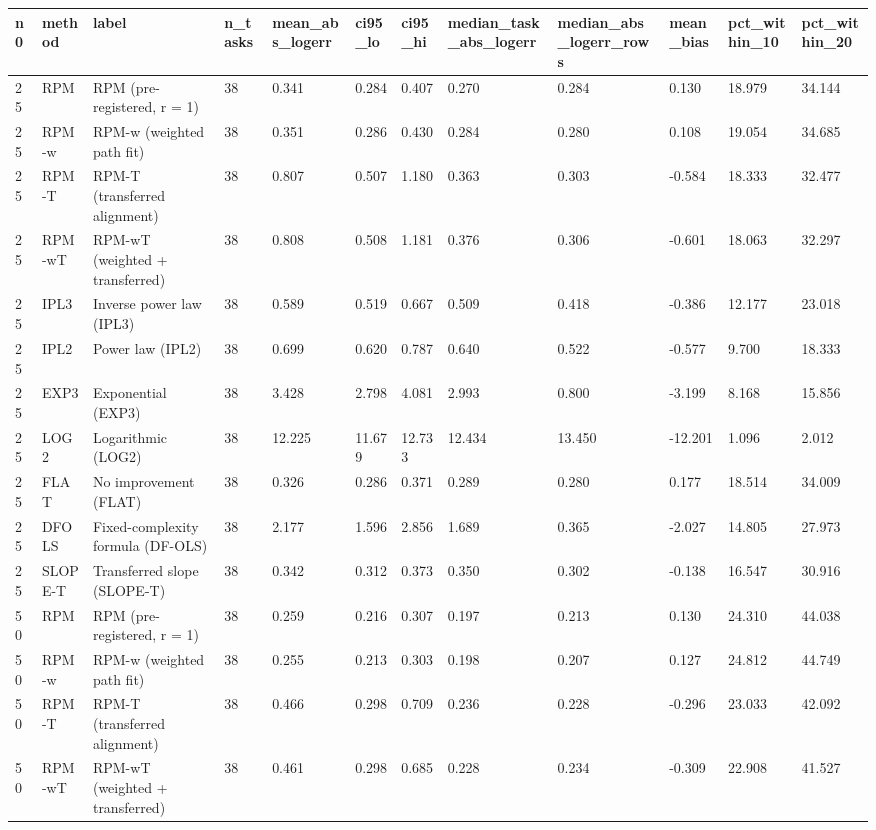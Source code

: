 \begin{tabular}{llllllllllll}
\hline
n0 & method & label & n\_tasks & mean\_abs\_logerr & ci95\_lo & ci95\_hi & median\_task\_abs\_logerr & median\_abs\_logerr\_rows & mean\_bias & pct\_within\_10 & pct\_within\_20 \\
\hline
25 & RPM & RPM (pre-registered, r = 1) & 38 & 0.341 & 0.284 & 0.407 & 0.270 & 0.284 & 0.130 & 18.979 & 34.144 \\
25 & RPM-w & RPM-w (weighted path fit) & 38 & 0.351 & 0.286 & 0.430 & 0.284 & 0.280 & 0.108 & 19.054 & 34.685 \\
25 & RPM-T & RPM-T (transferred alignment) & 38 & 0.807 & 0.507 & 1.180 & 0.363 & 0.303 & -0.584 & 18.333 & 32.477 \\
25 & RPM-wT & RPM-wT (weighted + transferred) & 38 & 0.808 & 0.508 & 1.181 & 0.376 & 0.306 & -0.601 & 18.063 & 32.297 \\
25 & IPL3 & Inverse power law (IPL3) & 38 & 0.589 & 0.519 & 0.667 & 0.509 & 0.418 & -0.386 & 12.177 & 23.018 \\
25 & IPL2 & Power law (IPL2) & 38 & 0.699 & 0.620 & 0.787 & 0.640 & 0.522 & -0.577 & 9.700 & 18.333 \\
25 & EXP3 & Exponential (EXP3) & 38 & 3.428 & 2.798 & 4.081 & 2.993 & 0.800 & -3.199 & 8.168 & 15.856 \\
25 & LOG2 & Logarithmic (LOG2) & 38 & 12.225 & 11.679 & 12.733 & 12.434 & 13.450 & -12.201 & 1.096 & 2.012 \\
25 & FLAT & No improvement (FLAT) & 38 & 0.326 & 0.286 & 0.371 & 0.289 & 0.280 & 0.177 & 18.514 & 34.009 \\
25 & DFOLS & Fixed-complexity formula (DF-OLS) & 38 & 2.177 & 1.596 & 2.856 & 1.689 & 0.365 & -2.027 & 14.805 & 27.973 \\
25 & SLOPE-T & Transferred slope (SLOPE-T) & 38 & 0.342 & 0.312 & 0.373 & 0.350 & 0.302 & -0.138 & 16.547 & 30.916 \\
50 & RPM & RPM (pre-registered, r = 1) & 38 & 0.259 & 0.216 & 0.307 & 0.197 & 0.213 & 0.130 & 24.310 & 44.038 \\
50 & RPM-w & RPM-w (weighted path fit) & 38 & 0.255 & 0.213 & 0.303 & 0.198 & 0.207 & 0.127 & 24.812 & 44.749 \\
50 & RPM-T & RPM-T (transferred alignment) & 38 & 0.466 & 0.298 & 0.709 & 0.236 & 0.228 & -0.296 & 23.033 & 42.092 \\
50 & RPM-wT & RPM-wT (weighted + transferred) & 38 & 0.461 & 0.298 & 0.685 & 0.228 & 0.234 & -0.309 & 22.908 & 41.527 \\

\end{tabular}
